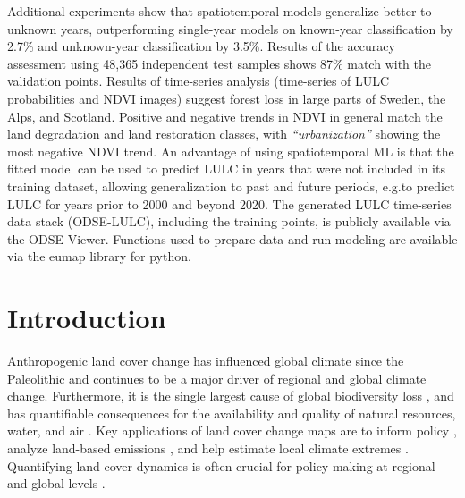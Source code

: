 Additional experiments show that spatiotemporal models generalize better to unknown years, outperforming single-year models on known-year classification by 2.7\% and unknown-year classification by 3.5\%. Results of the accuracy assessment using 48,365 independent test samples shows 87\% match with the validation points. Results of time-series analysis (time-series of LULC probabilities and NDVI images) suggest forest loss in large parts of Sweden, the Alps, and Scotland. Positive and negative trends in NDVI in general match the land degradation and land restoration classes, with \emph{``urbanization''} showing the most negative NDVI trend. An advantage of using spatiotemporal ML is that the fitted model can be used to predict LULC in years that were not included in its training dataset, allowing generalization to past and future periods, e.g.\@ to predict LULC for years prior to 2000 and beyond 2020. The generated LULC time-series data stack (ODSE-LULC), including the training points, is publicly available via the ODSE Viewer. Functions used to prepare data and run modeling are available via the \textsf{eumap} library for python.

\newpage

\section{Introduction}

Anthropogenic land cover change has influenced global climate since the Paleolithic \citep{kaplan2011holocene} and continues to be a major driver of regional \citep{pielke2002influence} and global \citep{houghton2012carbon} climate change. Furthermore, it is the single largest cause of global biodiversity loss \citep{sala2000global}, and has quantifiable consequences for the availability and quality of natural resources, water, and air \citep{foley2005global}. Key applications of land cover change maps are to inform policy \citep{duveiller2020}, analyze land-based emissions \citep{hong2021luemissions}, and help estimate local climate extremes \citep{sy2020}. Quantifying land cover dynamics is often crucial for policy-making at regional and global levels \citep{liu2020assessing,trisurat2019land,shumba2020effectiveness}.
    
